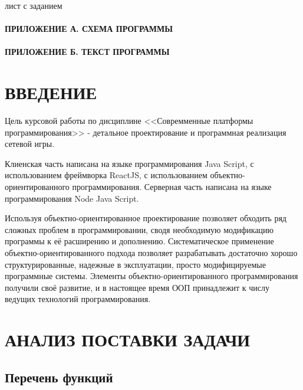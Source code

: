 \documentclass[12pt, a4paper, simple]{eskdtext}
\begin{document}
    

    лист с заданием
    \newpage

    \tableofcontents                                
    \paragraph{ПРИЛОЖЕНИЕ А. СХЕМА ПРОГРАММЫ}
    \paragraph{ПРИЛОЖЕНИЕ Б. ТЕКСТ ПРОГРАММЫ}
    \newpage

    \newpage
    \section*{ВВЕДЕНИЕ}

    Цель курсовой работы по дисциплине <<Совремменные платформы программирования>> - детальное проектирование и программная реализация сетевой игры.

    Клиенская часть написана на языке программирования Java Script, с использованием фреймворка ReactJS,
    с использованием объектно-ориентированного программирования.
    Серверная часть написана на языке программирования Node Java Script.

    Используя объектно-ориентированное проектирование позволяет обходить ряд сложных проблем в программировании,
    сводя необходимую модификацию программы к её расширению и дополнению.
    Систематическое применение объектно-ориентированного подхода позволяет разрабатывать достаточно хорошо структурированные,
    надежные в эксплуатации, просто модифицируемые программные системы.
    Элементы объектно-ориентированного программирования получили своё развитие, и в настоящее время ООП принадлежит к числу ведущих технологий программирования.

    \newpage

    \section{АНАЛИЗ ПОСТАВКИ ЗАДАЧИ}
    \subsection{Перечень функций}
\end{document}
